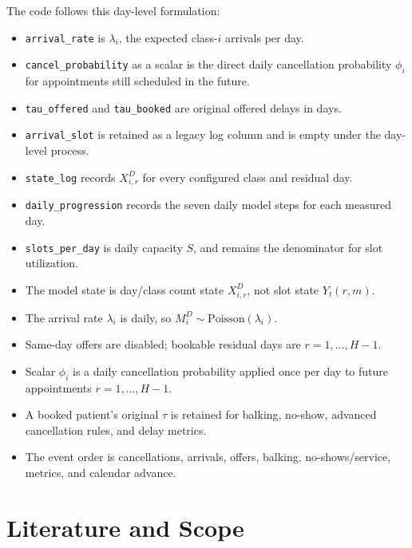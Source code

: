 \documentclass[11pt]{article}
\begin{document}
The code follows this day-level formulation:
\begin{itemize}[nosep]
    \item \texttt{arrival\_rate} is \(\lambda_i\), the expected class-\(i\) arrivals per day.
    \item \texttt{cancel\_probability} as a scalar is the direct daily cancellation probability \(\phi_i\) for appointments still scheduled in the future.
    \item \texttt{tau\_offered} and \texttt{tau\_booked} are original offered delays in days.
    \item \texttt{arrival\_slot} is retained as a legacy log column and is empty under the day-level process.
    \item \texttt{state\_log} records \(X_{i,r}^{D}\) for every configured class and residual day.
    \item \texttt{daily\_progression} records the seven daily model steps for each measured day.
    \item \texttt{slots\_per\_day} is daily capacity \(S\), and remains the denominator for slot utilization.
\end{itemize}

\begin{reviewbox}[title={Review Against the Intended New Model}]
\begin{itemize}[nosep]
    \item The model state is day/class count state \(X_{i,r}^{D}\), not slot state \(Y_t(r,m)\).
    \item The arrival rate \(\lambda_i\) is daily, so \(M_i^D\sim\mathrm{Poisson}(\lambda_i)\).
    \item Same-day offers are disabled; bookable residual days are \(r=1,\dots,H-1\).
    \item Scalar \(\phi_i\) is a daily cancellation probability applied once per day to future appointments \(r=1,\dots,H-1\).
    \item A booked patient's original \(\tau\) is retained for balking, no-show, advanced cancellation rules, and delay metrics.
    \item The event order is cancellations, arrivals, offers, balking, no-shows/service, metrics, and calendar advance.
\end{itemize}
\end{reviewbox}

\section{Literature and Scope}
\end{document}
